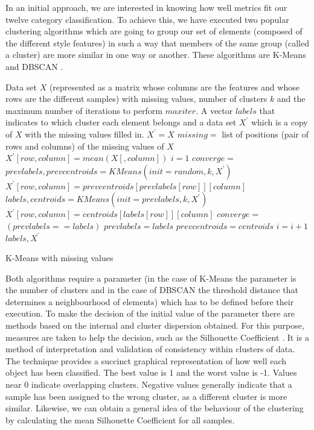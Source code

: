 In an initial approach, we are interested in knowing how well metrics fit our twelve category classification. To achieve this, we have executed two popular clustering algorithms which are going to group our set of elements (composed of the different style features) in such a way that members of the same group (called a cluster) are more similar in one way or another. These algorithms are K-Means \citep{hartigan1975clustering} and DBSCAN \citep{ester1996density}.

\begin{algorithm}
	\begin{algorithmic}[1]
		\REQUIRE Data set $X$ (represented as a matrix whose columns are the features and whose rows are the different samples) with missing values, number of clusters $k$ and the maximum number of iterations to perform $maxiter$.
		\ENSURE A vector $labels$ that indicates to which cluster each element belongs and a data set $X^\prime$ which is a copy of $X$ with the missing values filled in.
		\STATE $X^\prime = X$
		\STATE $missing = $ list of positions (pair of rows and columns) of the missing values of $X$
		\STATE $X^\prime[row, column] = mean(X[, column])$
		\ENDFOR
		\STATE $i = 1$
		\STATE $converge =$ \FALSE
		\STATE $prevlabels, prevcentroids = KMeans(init = random, k, X^\prime)$
		\STATE $X^\prime[row, column] = prevcentroids[prevlabels[row]][column]$
		\ENDFOR
		\STATE $labels, centroids = KMeans(init = prevlabels, k, X^\prime)$
		\STATE $X^\prime[row, column] = centroids[labels[row]][column]$
		\ENDFOR
		\STATE $converge =$ $(prevlabels == labels)$
		\STATE $prevlabels = labels$
		\STATE $prevcentroids = centroids$
		\STATE $i = i + 1$
		\ENDIF
		\ENDWHILE
		\RETURN $labels, X^\prime$
	\end{algorithmic}
	\caption{K-Means with missing values}\label{alg:kpod}
\end{algorithm}

Both algorithms require a parameter (in the case of K-Means the parameter is the number of clusters and in the case of DBSCAN the threshold distance that determines a neighbourhood of elements) which has to be defined before their execution. To make the decision of the initial value of the parameter there are methods based on the internal and cluster dispersion obtained. For this purpose, measures are taken to help the decision, such as the Silhouette Coefficient \citep{rousseeuw1987silhouettes}. It is a method of interpretation and validation of consistency within clusters of data. The technique provides a succinct graphical representation of how well each object has been classified. The best value is 1 and the worst value is -1. Values near 0 indicate overlapping clusters. Negative values generally indicate that a sample has been assigned to the wrong cluster, as a different cluster is more similar. Likewise, we can obtain a general idea of the behaviour of the clustering by calculating the mean Silhouette Coefficient for all samples.

